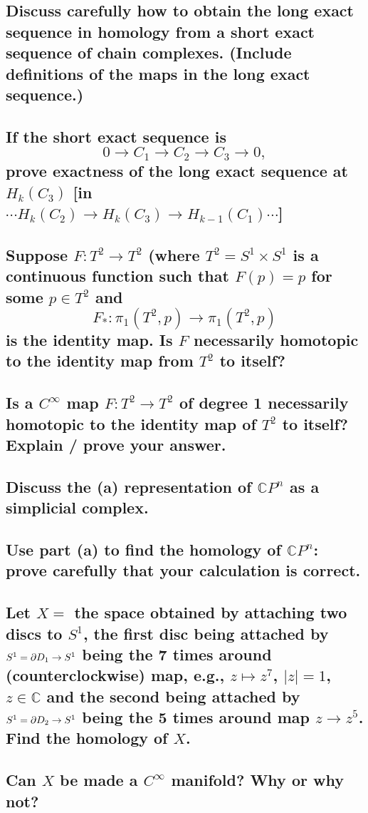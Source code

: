 \documentclass[10pt]{article}
\begin{document}
\advsection{}

\subsection{Discuss carefully how to obtain the long exact sequence in homology from a short exact
  sequence of chain complexes. (Include definitions of the maps in the long exact sequence.)}

\subsection{If the short exact sequence is 
$$0 \to C_1 \to C_2 \to C_3 \to 0,$$
prove exactness of the long exact sequence at $H_k(C_3)$ [in $\cdots H_k (C_2) \to H_k(C_3) \to
H_{k-1}(C_1) \cdots$]}

\advsection{}

\subsection{Suppose $F: T^2 \to T^2$ (where $T^2 = S^1 \times S^1$ is a continuous function such
  that $F(p ) =p$ for some $p \in T^2$ and
$$F_* : \pi_1(T^2, p) \to \pi_1(T^2, p) $$
is the identity map. Is $F$ necessarily homotopic to the identity map from $T^2$ to itself?  }

\subsection{Is a $C^\infty$ map $F: T^2 \to T^2$ of degree 1 necessarily homotopic to the identity
  map of $T^2$ to itself? Explain / prove your answer.}

\advsection{}

\subsection{Discuss the (a) representation of $\mathbb{C} P^n$ as a simplicial complex.}

\subsection{Use part (a) to find the homology of $\mathbb{C} P^n$: prove carefully that your
  calculation is correct.}

\advsection{}

\subsection{Let $X =$ the space obtained by attaching two discs to $S^1$, the first disc being
  attached by $S^1 = \partial D_1 \to S^1$ being the 7 times around (counterclockwise) map, e.g.,
  $z\mapsto z^7$, $|z|=1$, $z \in \mathbb{C} $ and the second being attached by $S^1 = \partial D_2 \to
  S^1$ being the 5 times around map $z \to z^5$. Find the homology of $X$.}


\subsection{Can $X$ be made a $C^\infty$ manifold? Why or why not?}
\end{document}
